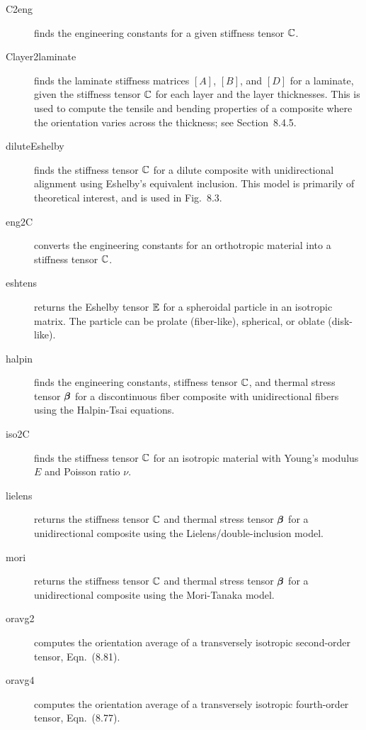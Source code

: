 \documentclass[11pt]{article}
\begin{document}
\begin{description}

    \item[C2eng]{finds the engineering constants for a given stiffness tensor $\mathbb{C}$.}

    \item[Clayer2laminate]{finds the laminate stiffness matrices $[A]$, $[B]$, and $[D]$ for a laminate, given the stiffness tensor $\mathbb{C}$ for each layer and the layer thicknesses.  This is used to compute the tensile and bending properties of a composite where the orientation varies across the thickness; see Section~8.4.5.}
    
    \item[diluteEshelby]{finds the stiffness tensor $\mathbb{C}$ for a dilute composite with unidirectional alignment using Eshelby's equivalent inclusion.  This model is primarily of theoretical interest, and is used in Fig.~8.3.}    
    
    \item[eng2C]{converts the engineering constants for an orthotropic material into a stiffness tensor $\mathbb{C}$.}    
    
    \item[eshtens]{returns the Eshelby tensor $\mathbb{E}$ for a spheroidal particle in an isotropic matrix.  The particle can be prolate (fiber-like), spherical, or oblate (disk-like).}
    
    \item[halpin]{finds the engineering constants, stiffness tensor $\mathbb{C}$, and thermal stress tensor $\boldsymbol{\beta}$ for a discontinuous fiber composite with unidirectional fibers using the Halpin-Tsai equations.}    
    
    \item[iso2C]{finds the stiffness tensor $\mathbb{C}$ for an isotropic material with Young's modulus $E$ and Poisson ratio $\nu$.}    
    
    \item[lielens]{returns the stiffness tensor $\mathbb{C}$ and thermal stress tensor $\boldsymbol{\beta}$ for a unidirectional composite using the Lielens/double-inclusion model.}    
    
    \item[mori]{returns the stiffness tensor $\mathbb{C}$ and thermal stress tensor $\boldsymbol{\beta}$ for a unidirectional composite using the Mori-Tanaka model.}   
    
    \item[oravg2]{computes the orientation average of a transversely isotropic second-order tensor, Eqn.~(8.81).}   
    
    \item[oravg4]{computes the orientation average of a transversely isotropic fourth-order tensor, Eqn.~(8.77).}   
    
\end{description}
\end{document}
